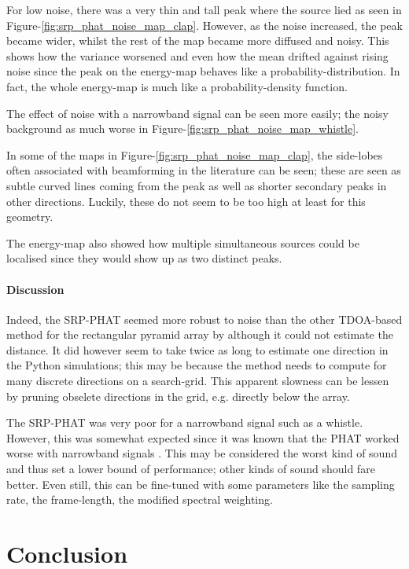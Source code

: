 \documentclass[notitlepage]{report}
\begin{document}
For low noise, there was a very thin and tall peak where the source lied as seen in Figure-\ref{fig:srp_phat_noise_map_clap}. However, as the noise increased, the peak became wider, whilst the rest of the map became more diffused and noisy. This shows how the variance worsened and even how the mean drifted against rising noise since the peak on the energy-map behaves like a probability-distribution. In fact, the whole energy-map is much like a probability-density function.

The effect of noise with a narrowband signal can be seen more easily; the noisy background as much worse in Figure-\ref{fig:srp_phat_noise_map_whistle}.

In some of the maps in Figure-\ref{fig:srp_phat_noise_map_clap}, the side-lobes often associated with beamforming in the literature can be seen; these are seen as subtle curved lines coming from the peak as well as shorter secondary peaks in other directions. Luckily, these do not seem to be too high at least for this geometry.

The energy-map also showed how multiple simultaneous sources could be localised since they would show up as two distinct peaks.

\subsubsection{Discussion}

Indeed, the SRP-PHAT seemed more robust to noise than the other TDOA-based method for the rectangular pyramid array by \cite{chen_sound_2019} although it could not estimate the distance. It did however seem to take twice as long to estimate one direction in the Python simulations; this may be because the method needs to compute for many discrete directions on a search-grid. This apparent slowness can be lessen by pruning obselete directions in the grid, e.g. directly below the array.

The SRP-PHAT was very poor for a narrowband signal such as a whistle. However, this was somewhat expected since it was known that the PHAT worked worse with narrowband signals \cite{valin_localization_2004} \cite{valin_robust_2007}. This may be considered the worst kind of sound and thus set a lower bound of performance; other kinds of sound should fare better. Even still, this can be fine-tuned with some parameters like the sampling rate, the frame-length, the modified spectral weighting. 

\chapter{Conclusion}
\end{document}
